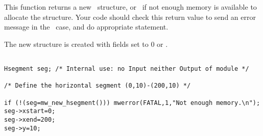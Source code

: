 \newpage %


\Description
This function returns a new \hsegment\ structure, or \Null\ if not enough 
memory is available to allocate the structure. 
Your code should check this return value to send an error message in the 
\Null\ case, and do appropriate statement.

The new structure is created with fields set to $0$ or \Null.

\Next
\Example
\begin{verbatim}

Hsegment seg; /* Internal use: no Input neither Output of module */

/* Define the horizontal segment (0,10)-(200,10) */

if (!(seg=mw_new_hsegment())) mwerror(FATAL,1,"Not enough memory.\n");
seg->xstart=0; 
seg->xend=200;
seg->y=10;
\end{verbatim}

\newpage %


